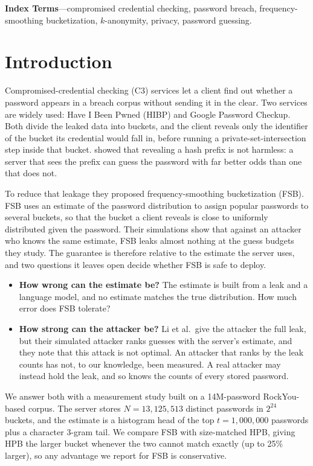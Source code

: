 \noindent\textbf{Index Terms}---compromised credential checking, password breach, frequency-smoothing bucketization, $k$-anonymity, privacy, password guessing.

\section{Introduction}\label{sec:intro}

Compromised-credential checking (C3) services let a client find out whether a password appears in a breach corpus without sending it in the clear. Two services are widely used: Have I Been Pwned (HIBP) and Google Password Checkup. Both divide the leaked data into buckets, and the client reveals only the identifier of the bucket its credential would fall in, before running a private-set-intersection step inside that bucket. \citet[CCS][]{li2019} showed that revealing a hash prefix is not harmless: a server that sees the prefix can guess the password with far better odds than one that does not.

To reduce that leakage they proposed frequency-smoothing bucketization (FSB). FSB uses an estimate of the password distribution to assign popular passwords to several buckets, so that the bucket a client reveals is close to uniformly distributed given the password. Their simulations show that against an attacker who knows the same estimate, FSB leaks almost nothing at the guess budgets they study. The guarantee is therefore relative to the estimate the server uses, and two questions it leaves open decide whether FSB is safe to deploy.

\begin{itemize}
\item \textbf{How wrong can the estimate be?} The estimate is built from a leak and a language model, and no estimate matches the true distribution. How much error does FSB tolerate?
\item \textbf{How strong can the attacker be?} Li et al.\ give the attacker the full leak, but their simulated attacker ranks guesses with the server's estimate, and they note that this attack is not optimal. An attacker that ranks by the leak counts has not, to our knowledge, been measured. A real attacker may instead hold the leak, and so knows the counts of every stored password.
\end{itemize}

We answer both with a measurement study built on a 14M-password RockYou-based corpus. The server stores $N=13{,}125{,}513$ distinct passwords in $2^{24}$ buckets, and the estimate is a histogram head of the top $t=1{,}000{,}000$ passwords plus a character 3-gram tail. We compare FSB with size-matched HPB, giving HPB the larger bucket whenever the two cannot match exactly (up to 25\% larger), so any advantage we report for FSB is conservative.

